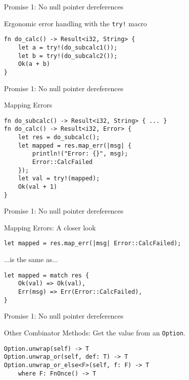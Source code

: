 \documentclass[aspectratio=1610,t]{beamer}
\begin{document}

\begin{frame}[fragile]{Promise 1: No null pointer dereferences}
\begin{block}{Ergonomic error handling with the \texttt{try!} macro}
\vspace{1em}
\begin{verbatim}
fn do_calc() -> Result<i32, String> {
    let a = try!(do_subcalc1());
    let b = try!(do_subcalc2());
    Ok(a + b)
}
\end{verbatim}
\end{block}
\end{frame}


\begin{frame}[fragile]{Promise 1: No null pointer dereferences}
\begin{block}{Mapping Errors}
\vspace{1em}
\begin{verbatim}
fn do_subcalc() -> Result<i32, String> { ... }
fn do_calc() -> Result<i32, Error> {
    let res = do_subcalc();
    let mapped = res.map_err(|msg| {
        println!("Error: {}", msg);
        Error::CalcFailed
    });
    let val = try!(mapped);
    Ok(val + 1)
}
\end{verbatim}
\end{block}
\end{frame}


\begin{frame}[fragile]{Promise 1: No null pointer dereferences}
\begin{block}{Mapping Errors: A closer look}
\vspace{1em}
\begin{verbatim}
let mapped = res.map_err(|msg| Error::CalcFailed);
\end{verbatim}
...is the same as...
\begin{verbatim}
let mapped = match res {
    Ok(val) => Ok(val),
    Err(msg) => Err(Error::CalcFailed),
}
\end{verbatim}
\end{block}
\end{frame}


\begin{frame}[fragile]{Promise 1: No null pointer dereferences}
\begin{block}{Other Combinator Methods:}
\vspace{1em}
Get the value from an \texttt{Option}.
\vspace{0.5em}
\begin{verbatim}
Option.unwrap(self) -> T
Option.unwrap_or(self, def: T) -> T
Option.unwrap_or_else<F>(self, f: F) -> T
    where F: FnOnce() -> T
\end{verbatim}
\end{block}
\end{frame}
\end{document}
